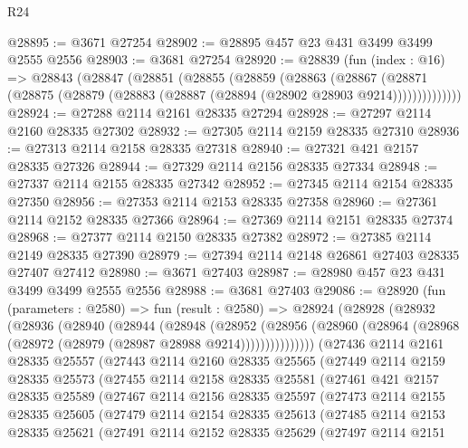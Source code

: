 \begin{lexlean}{R24}
\begin{coremodule}
@28895 := @3671 @27254
@28902 := @28895 @457 @23 @431 @3499 @3499 @2555 @2556
@28903 := @3681 @27254
@28920 := @28839
    (fun (index : @16) =>
    @28843
      (@28847
        (@28851
          (@28855
            (@28859
              (@28863
                (@28867
                  (@28871 (@28875 (@28879 (@28883 (@28887 (@28894 (@28902 @28903 @9214))))))))))))))
@28924 := @27288 @2114 @2161 @28335 @27294
@28928 := @27297 @2114 @2160 @28335 @27302
@28932 := @27305 @2114 @2159 @28335 @27310
@28936 := @27313 @2114 @2158 @28335 @27318
@28940 := @27321 @421 @2157 @28335 @27326
@28944 := @27329 @2114 @2156 @28335 @27334
@28948 := @27337 @2114 @2155 @28335 @27342
@28952 := @27345 @2114 @2154 @28335 @27350
@28956 := @27353 @2114 @2153 @28335 @27358
@28960 := @27361 @2114 @2152 @28335 @27366
@28964 := @27369 @2114 @2151 @28335 @27374
@28968 := @27377 @2114 @2150 @28335 @27382
@28972 := @27385 @2114 @2149 @28335 @27390
@28979 := @27394 @2114 @2148 @26861 @27403 @28335 @27407 @27412
@28980 := @3671 @27403
@28987 := @28980 @457 @23 @431 @3499 @3499 @2555 @2556
@28988 := @3681 @27403
@29086 := @28920
    (fun (parameters : @2580) =>
    fun (result : @2580) =>
    @28924
      (@28928
        (@28932
          (@28936
            (@28940
              (@28944
                (@28948
                  (@28952
                    (@28956
                      (@28960 (@28964 (@28968 (@28972 (@28979 (@28987 @28988 @9214)))))))))))))))
    (@27436
      @2114
      @2161
      @28335
      @25557
      (@27443
        @2114
        @2160
        @28335
        @25565
        (@27449
          @2114
          @2159
          @28335
          @25573
          (@27455
            @2114
            @2158
            @28335
            @25581
            (@27461
              @421
              @2157
              @28335
              @25589
              (@27467
                @2114
                @2156
                @28335
                @25597
                (@27473
                  @2114
                  @2155
                  @28335
                  @25605
                  (@27479
                    @2114
                    @2154
                    @28335
                    @25613
                    (@27485
                      @2114
                      @2153
                      @28335
                      @25621
                      (@27491
                        @2114
                        @2152
                        @28335
                        @25629
                        (@27497
                          @2114
                          @2151

\end{coremodule}
\end{lexlean}
